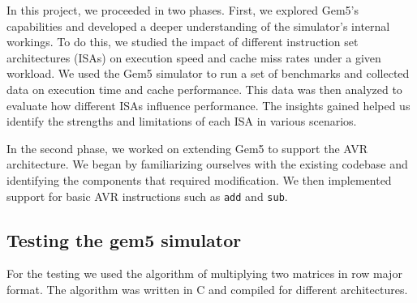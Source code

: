 In this project, we proceeded in two phases. First, we explored Gem5's capabilities and developed a deeper understanding of the simulator's internal workings. To do this, we studied the impact of different instruction set architectures (ISAs) on execution speed and cache miss rates under a given workload. We used the Gem5 simulator to run a set of benchmarks and collected data on execution time and cache performance. This data was then analyzed to evaluate how different ISAs influence performance. The insights gained helped us identify the strengths and limitations of each ISA in various scenarios.

In the second phase, we worked on extending Gem5 to support the AVR architecture. We began by familiarizing ourselves with the existing codebase and identifying the components that required modification. We then implemented support for basic AVR instructions such as \texttt{add} and \texttt{sub}.

\subsection{Testing the gem5 simulator}
For the testing we used the algorithm of multiplying two matrices in row major format. The algorithm was written in C and compiled for different architectures.

